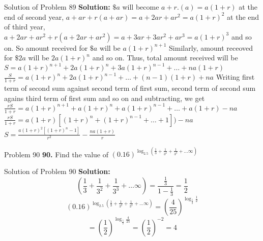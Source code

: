 \documentclass[aspectratio=1610,8pt]{beamer}
\begin{document}
\begin{frame}{Solution of Problem 89}
  \textbf{Solution:} $\$a$ will become $a + r.(a) = a(1 + r)$ at the end of second year, $a + ar + r(a + ar) = a + 2ar + ar^2 = a(1
  + r)^2$ at the end of third year, $a + 2ar + ar^2 + r(a + 2ar + ar^2) = a + 3ar + 3ar^2 + ar^3 = a(1 + r)^3$ and so on. So
  amount received for $\$a$ will be $a(1 + r)^{n + 1}$
  \linebreak\linebreak
  Similarly, amount receoved for $\$2a$ will be $2a(1 + r)^n$ and so on.
  \linebreak\linebreak
  Thus, total amount received will be $S = a(1 + r)^{n + 1} + 2a(1 + r)^n + 3a(1 + r)^{n - 1} + \ldots + na(1 + r)$
  \linebreak\linebreak
  $\frac{S}{1 + r} = a(1 + r)^n + 2a(1 + r)^{n - 1} + \ldots + (n - 1)(1 + r) + na$
  \linebreak\linebreak
  Writing first term of second sum against second term of first sum, second term of second sum agains third term of first sum and
  so on and subtracting, we get $\frac{rS}{1 + r} = a(1 + r)^{n + 1} + a(1 + r)^{n} + a(1 + r)^{n - 1} + \ldots + a(1 + r) - na$
  \linebreak\linebreak
  $\frac{rS}{1 + r} = a(1 + r)[(1 + r)^n + (1 + r)^{n - 1}  + \ldots + 1]) - na$
  \linebreak\linebreak
  $S = \frac{a(1 + r)^2[(1 + r)^n - 1]}{r^2} - \frac{na(1 + r)}{r}$
\end{frame}
\begin{frame}{Problem 90}
  \textbf{90.} Find the value of $(0.16)^{\log_{2.5}\left(\frac{1}{3} + \frac{1}{3^2} + \frac{1}{3^3} + \ldots \infty\right)}$
\end{frame}
\begin{frame}{Solution of Problem 90}
  \textbf{Solution:} $$\left(\frac{1}{3} + \frac{1}{3^2} + \frac{1}{3^3} + \ldots \infty\right) = \frac{\frac{1}{3}}{1 -
    \frac{1}{3}} = \frac{1}{2}$$
  $$(0.16)^{\log_{2.5}\left(\frac{1}{3} + \frac{1}{3^2} + \frac{1}{3^3} + \ldots \infty\right)} =
  \left(\frac{4}{25}\right)^{\log_{\frac{5}{2}}\frac{1}{2}}$$
  $$= \left(\frac{1}{2}\right)^{\log_{\frac{5}{2}}\frac{4}{25}} = \left(\frac{1}{2}\right)^{-2} = 4$$
\end{frame}
\end{document}
